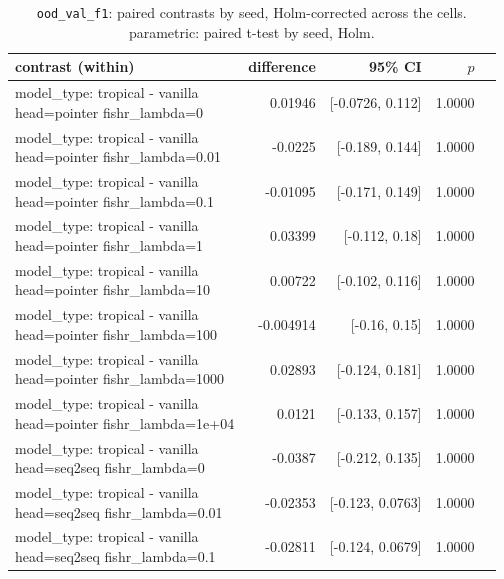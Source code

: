 \documentclass[10pt]{article}
\makeatletter
\newcommand{\stackcell}[1]{\begin{tabular}[t]{@{}l@{}}#1\end{tabular}}
\makeatother
\begin{document}
{\small
\begin{longtable}{lrrrl}
\caption{\texttt{ood\_val\_f1}: paired contrasts by seed, Holm-corrected across the cells. parametric: paired t-test by seed, Holm.}\label{tab:paired-ood_val_f1}\\
\toprule
contrast (within) & difference & 95\% CI & $p$ & \\
\midrule
\endhead
\stackcell{model\_type: tropical - vanilla\\\footnotesize head=pointer fishr\_lambda=0 } & 0.01946 & [-0.0726, 0.112] & 1.0000 & \\
\stackcell{model\_type: tropical - vanilla\\\footnotesize head=pointer fishr\_lambda=0.01 } & -0.0225 & [-0.189, 0.144] & 1.0000 & \\
\stackcell{model\_type: tropical - vanilla\\\footnotesize head=pointer fishr\_lambda=0.1 } & -0.01095 & [-0.171, 0.149] & 1.0000 & \\
\stackcell{model\_type: tropical - vanilla\\\footnotesize head=pointer fishr\_lambda=1 } & 0.03399 & [-0.112, 0.18] & 1.0000 & \\
\stackcell{model\_type: tropical - vanilla\\\footnotesize head=pointer fishr\_lambda=10 } & 0.00722 & [-0.102, 0.116] & 1.0000 & \\
\stackcell{model\_type: tropical - vanilla\\\footnotesize head=pointer fishr\_lambda=100 } & -0.004914 & [-0.16, 0.15] & 1.0000 & \\
\stackcell{model\_type: tropical - vanilla\\\footnotesize head=pointer fishr\_lambda=1000 } & 0.02893 & [-0.124, 0.181] & 1.0000 & \\
\stackcell{model\_type: tropical - vanilla\\\footnotesize head=pointer fishr\_lambda=1e+04 } & 0.0121 & [-0.133, 0.157] & 1.0000 & \\
\stackcell{model\_type: tropical - vanilla\\\footnotesize head=seq2seq fishr\_lambda=0 } & -0.0387 & [-0.212, 0.135] & 1.0000 & \\
\stackcell{model\_type: tropical - vanilla\\\footnotesize head=seq2seq fishr\_lambda=0.01 } & -0.02353 & [-0.123, 0.0763] & 1.0000 & \\
\stackcell{model\_type: tropical - vanilla\\\footnotesize head=seq2seq fishr\_lambda=0.1 } & -0.02811 & [-0.124, 0.0679] & 1.0000 & \\

\end{longtable}}
\end{document}
